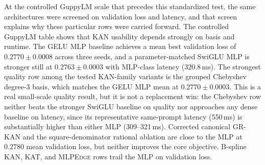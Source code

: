 \documentclass[11pt]{article}
\newcommand{\modelname}[1]{\textsc{#1}}
\newcommand{\grkan}{\modelname{GR-KAN}}
\newcommand{\mlpedge}{\modelname{MLPEdge}}
\begin{document}
At the controlled GuppyLM scale that precedes this standardized test, the same architectures were screened on validation loss and latency, and that screen explains why these particular rows were carried forward. The controlled GuppyLM table shows that KAN usability depends strongly on basis and runtime. The GELU MLP baseline achieves a mean best validation loss of \(0.2770\pm0.0008\) across three seeds, and a parameter-matched SwiGLU MLP is stronger still at \(0.2763\pm0.0003\) with MLP-class latency (320.8\,ms). The strongest quality row among the tested KAN-family variants is the grouped Chebyshev degree-3 basis, which matches the GELU MLP mean at \(0.2770\pm0.0003\). This is a real small-scale quality result, but it is not a replacement win: the Chebyshev row neither beats the stronger SwiGLU baseline on quality nor approaches any dense baseline on latency, since its representative same-prompt latency (550\,ms) is substantially higher than either MLP (309--321\,ms). Corrected canonical \grkan{} and the square-denominator rational ablation are close to the MLP at \(0.2780\) mean validation loss, but neither improves the core objective. B-spline KAN, KAT, and \mlpedge{} rows trail the MLP on validation loss.
\end{document}
